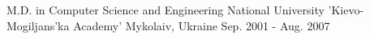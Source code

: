 

\begin{cventries}

  \cventry
    {M.D. in Computer Science and Engineering} %
    {National University 'Kievo-Mogiljans'ka Academy'} %
    {Mykolaiv, Ukraine} %
    {Sep. 2001 - Aug. 2007} %
    {}

\end{cventries}
